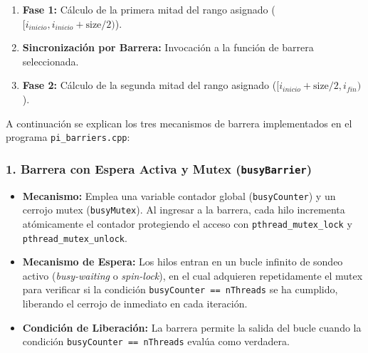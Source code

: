\documentclass[11pt,a4paper]{article}
\begin{document}
\begin{enumerate}
    \item \textbf{Fase 1:} Cálculo de la primera mitad del rango asignado ($[i_{inicio}, i_{inicio} + \text{size}/2)$).
    \item \textbf{Sincronización por Barrera:} Invocación a la función de barrera seleccionada.
    \item \textbf{Fase 2:} Cálculo de la segunda mitad del rango asignado ($[i_{inicio} + \text{size}/2, i_{fin})$).
\end{enumerate}

A continuación se explican los tres mecanismos de barrera implementados en el programa \texttt{pi\_barriers.cpp}:

\subsubsection{1. Barrera con Espera Activa y Mutex (\texttt{busyBarrier})}
\begin{itemize}
    \item \textbf{Mecanismo:} Emplea una variable contador global (\texttt{busyCounter}) y un cerrojo mutex (\texttt{busyMutex}). Al ingresar a la barrera, cada hilo incrementa atómicamente el contador protegiendo el acceso con \texttt{pthread\_mutex\_lock} y \texttt{pthread\_mutex\_unlock}.
    \item \textbf{Mecanismo de Espera:} Los hilos entran en un bucle infinito de sondeo activo (\textit{busy-waiting} o \textit{spin-lock}), en el cual adquieren repetidamente el mutex para verificar si la condición \texttt{busyCounter == nThreads} se ha cumplido, liberando el cerrojo de inmediato en cada iteración.
    \item \textbf{Condición de Liberación:} La barrera permite la salida del bucle cuando la condición \texttt{busyCounter == nThreads} evalúa como verdadera.
\end{itemize}
\end{document}
